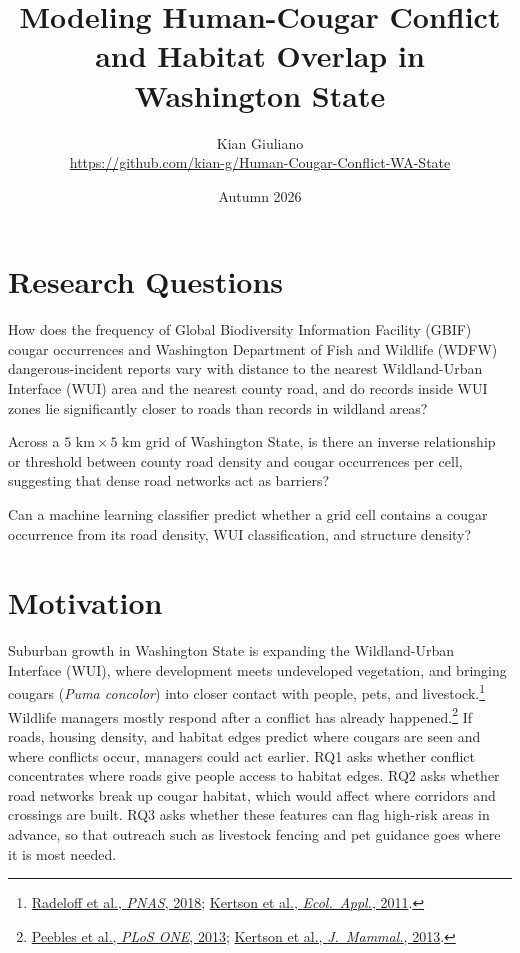 \documentclass[11pt, a4paper]{article}
\title{\textbf{Modeling Human-Cougar Conflict and Habitat Overlap in Washington State}}
\author{Kian Giuliano\\[3pt]\href{https://github.com/kian-g/Human-Cougar-Conflict-WA-State}{https://github.com/kian-g/Human-Cougar-Conflict-WA-State}}
\date{Autumn 2026}
\begin{document}
\maketitle
\thispagestyle{plain}

\section{Research Questions}
\begin{description}[leftmargin=2em, labelwidth=1.5em, itemsep=1em, parsep=0pt]
  \item[\textbf{RQ1:}] How does the frequency of Global Biodiversity Information Facility (GBIF) cougar occurrences and Washington Department of Fish and Wildlife (WDFW) dangerous-incident reports vary with distance to the nearest Wildland-Urban Interface (WUI) area and the nearest county road, and do records inside WUI zones lie significantly closer to roads than records in wildland areas?

  \item[\textbf{RQ2:}] Across a $5\text{ km} \times 5\text{ km}$ grid of Washington State, is there an inverse relationship or threshold between county road density and cougar occurrences per cell, suggesting that dense road networks act as barriers?

  \item[\textbf{RQ3:}] Can a machine learning classifier predict whether a grid cell contains a cougar occurrence from its road density, WUI classification, and structure density?
\end{description}

\section{Motivation}
Suburban growth in Washington State is expanding the Wildland-Urban Interface (WUI), where development meets undeveloped vegetation, and bringing cougars (\textit{Puma concolor}) into closer contact with people, pets, and livestock.\footnote{\href{https://doi.org/10.1073/pnas.1718850115}{Radeloff et al., \textit{PNAS}, 2018}; \href{https://doi.org/10.1890/11-0947.1}{Kertson et al., \textit{Ecol.\ Appl.}, 2011}.} Wildlife managers mostly respond after a conflict has already happened.\footnote{\href{https://doi.org/10.1371/journal.pone.0079713}{Peebles et al., \textit{PLoS ONE}, 2013}; \href{https://doi.org/10.1644/12-MAMM-A-051.1}{Kertson et al., \textit{J.\ Mammal.}, 2013}.} If roads, housing density, and habitat edges predict where cougars are seen and where conflicts occur, managers could act earlier. RQ1 asks whether conflict concentrates where roads give people access to habitat edges. RQ2 asks whether road networks break up cougar habitat, which would affect where corridors and crossings are built. RQ3 asks whether these features can flag high-risk areas in advance, so that outreach such as livestock fencing and pet guidance goes where it is most needed.
\end{document}
